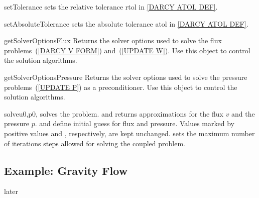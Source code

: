 \begin{methoddesc}[DarcyFlow]{setTolerance}{}
sets the relative tolerance \mbox{rtol} in \ref{DARCY ATOL DEF}.
\end{methoddesc}

\begin{methoddesc}[DarcyFlow]{setAbsoluteTolerance}{}
sets the absolute tolerance \mbox{atol} in \ref{DARCY ATOL DEF}.
\end{methoddesc}

\begin{methoddesc}[DarcyFlow]{getSolverOptionsFlux}{}
Returns the solver options used to solve the flux problems~(\ref{DARCY V FORM}) and~(\ref{UPDATE W}). Use this
 \SolverOptions object to control the solution algorithms. 
\end{methoddesc}

\begin{methoddesc}[DarcyFlow]{getSolverOptionsPressure}{}
Returns the solver options used to solve the pressure problems~(\ref{UPDATE P}) as a preconditioner. 
Use this \SolverOptions object to control the solution algorithms. 
\end{methoddesc}

\begin{methoddesc}[DarcyFlow]{solve}{u0,p0, }
solves the problem. and returns approximations for the flux $v$ and the pressure $p$. 
 and  define initial guess for flux and pressure. Values marked
by positive values  and , respectively, are kept unchanged.  sets the maximum number of iterations steps allowed for solving the coupled problem.
\end{methoddesc}


\subsection{Example: Gravity Flow}
later